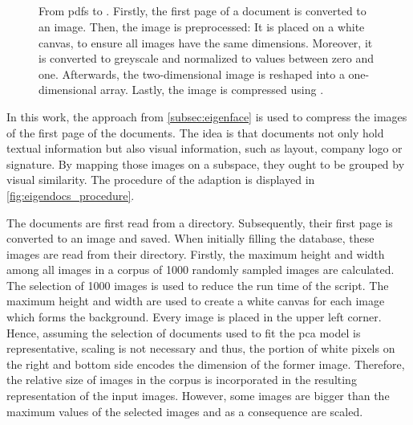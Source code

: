 \subsection{\eigendocs{}}\label{subsubsec:eigendocs}

\begin{figure}[!htb] %
    \centering
    
    \caption[\eigendocs{} procedure]{From \acp{pdf} to \eigendocs{}.
    Firstly, the first page of a document is converted to an image.
    Then, the image is preprocessed:
    It is placed on a white canvas, to ensure all images have the same dimensions.
    Moreover, it is converted to greyscale and normalized to values between zero and one.
    Afterwards, the two-dimensional image is reshaped into a one-dimensional array.
    Lastly, the image is compressed using \eigendocs{}.
    }
    \label{fig:eigendocs_procedure}
\end{figure}

In this work, the \eigenfaces{} approach from \autoref{subsec:eigenface} is used to compress the images of the first page of the documents.
The idea is that documents not only hold textual information but also visual information, such as layout, company logo or signature.
By mapping those images on a subspace, they ought to be grouped by visual similarity.
The procedure of the \eigenfaces{} adaption \textit{\eigendocs{}} is displayed in \autoref{fig:eigendocs_procedure}.

The documents are first read from a directory. 
Subsequently, their first page is converted to an image and saved.
When initially filling the database, these images are read from their directory.
Firstly, the maximum height and width among all images in a corpus of 1000 randomly sampled images are calculated.
The selection of 1000 images is used to reduce the run time of the script.
The maximum height and width are used to create a white canvas for each image which forms the background.
Every image is placed in the upper left corner.
Hence, assuming the selection of documents used to fit the \ac{pca} model is representative, 
scaling is not necessary and thus, the portion of white pixels on the right and bottom side encodes the dimension of the former image.
Therefore, the relative size of images in the corpus is incorporated in the resulting representation of the input images.
However, some images are bigger than the maximum values of the selected images and as a consequence are scaled.

